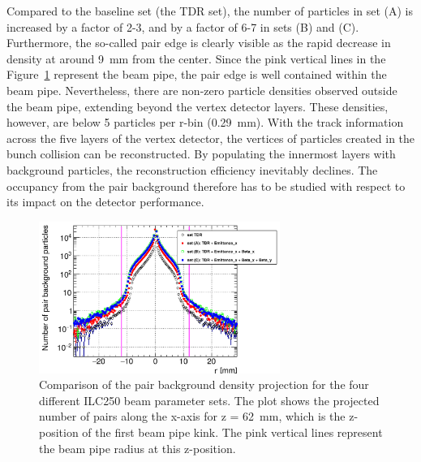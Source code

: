 Compared to the baseline set (the TDR set), the number of particles in set (A) is increased by a factor of 2-3, and by a factor of 6-7 in sets (B) and (C).
Furthermore, the so-called pair edge is clearly visible as the rapid decrease in density at around \SI{9}{\milli\meter} from the center.
Since the pink vertical lines in the Figure~\ref{fig:PairBkg:Density_Projection} represent the beam pipe, the pair edge is well contained within the beam pipe.
Nevertheless, there are non-zero particle densities observed outside the beam pipe, extending beyond the vertex detector layers.
These densities, however, are below 5 particles per r-bin (\SI{0.29}{\milli\meter}).
With the track information across the five layers of the vertex detector, the vertices of particles created in the bunch collision can be reconstructed.
By populating the innermost layers with background particles, the reconstruction efficiency inevitably declines.
The occupancy from the pair background therefore has to be studied with respect to its impact on the detector performance.
\begin{figure}
    \centering
    \includegraphics[width=0.7\textwidth]{Figures/Pairs/HelixEnvelope_Projection_Comparison_250GeV_parametersets_LEG.png}
    \caption[Pair background density projection for different ILC250 beam parameter sets]{
    Comparison of the pair background density projection for the four different ILC250 beam parameter sets.
    The plot shows the projected number of pairs along the x-axis for z = \SI[detect-all]{62}{\milli\meter}, which is the z-position of the first beam pipe kink.
    The pink vertical lines represent the beam pipe radius at this z-position.
    }
    \label{fig:PairBkg:Density_Projection}
\end{figure}

